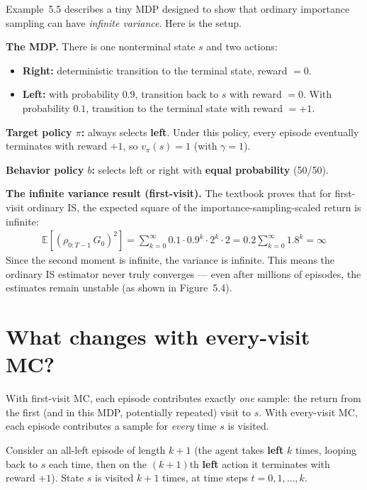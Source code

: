 \documentclass[11pt]{article}
\begin{document}
Example~5.5 describes a tiny MDP designed to show that ordinary importance sampling can have \textit{infinite variance}. Here is the setup.

\textbf{The MDP.} There is one nonterminal state $s$ and two actions:
\begin{itemize}[nosep]
    \item \textbf{Right:} deterministic transition to the terminal state, reward $= 0$.
    \item \textbf{Left:} with probability $0.9$, transition back to $s$ with reward $= 0$. With probability $0.1$, transition to the terminal state with reward $= +1$.
\end{itemize}

\textbf{Target policy $\pi$:} always selects \textbf{left}. Under this policy, every episode eventually terminates with reward $+1$, so $v_\pi(s) = 1$ (with $\gamma = 1$).

\textbf{Behavior policy $b$:} selects left or right with \textbf{equal probability} (50/50).

\textbf{The infinite variance result (first-visit).} The textbook proves that for first-visit ordinary IS, the expected square of the importance-sampling-scaled return is infinite:
\begin{align}
    \mathbb{E}\left[\left(\rho_{0:T-1} \, G_0\right)^2\right] = \sum_{k=0}^{\infty} 0.1 \cdot 0.9^k \cdot 2^k \cdot 2 = 0.2 \sum_{k=0}^{\infty} 1.8^k = \infty
\end{align}
Since the second moment is infinite, the variance is infinite. This means the ordinary IS estimator never truly converges --- even after millions of episodes, the estimates remain unstable (as shown in Figure~5.4).

\section*{What changes with every-visit MC?}

With first-visit MC, each episode contributes exactly \textit{one} sample: the return from the first (and in this MDP, potentially repeated) visit to $s$. With every-visit MC, each episode contributes a sample for \textit{every} time $s$ is visited.

Consider an all-left episode of length $k+1$ (the agent takes \textbf{left} $k$ times, looping back to $s$ each time, then on the $(k{+}1)$th \textbf{left} action it terminates with reward $+1$). State $s$ is visited $k + 1$ times, at time steps $t = 0, 1, \ldots, k$.
\end{document}

